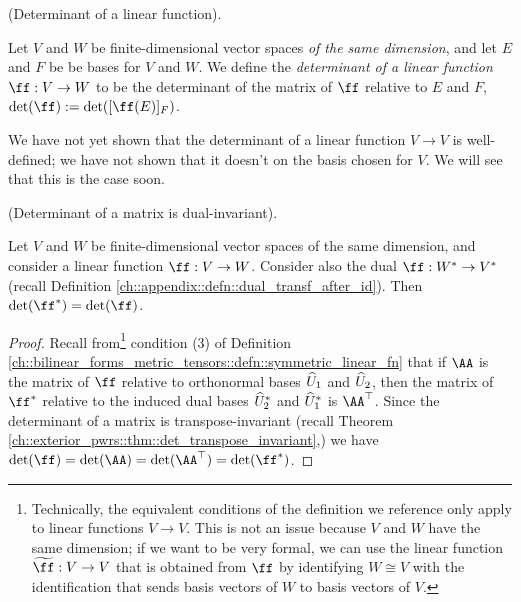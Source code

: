 

\begin{defn}
    (Determinant of a linear function).
    
    Let $V$ and $W$ be finite-dimensional vector spaces \textit{of the same dimension}, and let $E$ and $F$ be be bases for $V$ and $W$. We define the \textit{determinant of a linear function $\ff:V \rightarrow W$} to be the determinant of the matrix of $\ff$ relative to $E$ and $F$, $\det(\ff) := \det([\ff(E)]_F)$.
\end{defn}

\begin{remark}
    We have not yet shown that the determinant of a linear function $V \rightarrow V$ is well-defined; we have not shown that it doesn't on the basis chosen for $V$. We will see that this is the case soon.
\end{remark}

\begin{theorem}
\label{ch::exterior_pwrs::rmk::det_dual_invariant}
    (Determinant of a matrix is dual-invariant).
    
    Let $V$ and $W$ be finite-dimensional vector spaces of the same dimension, and consider a linear function $\ff:V \rightarrow W$. Consider also the dual $\ff:W^* \rightarrow V^*$ (recall Definition \ref{ch::appendix::defn::dual_transf_after_id}). Then $\det(\ff^*) = \det(\ff)$.
\end{theorem}

\begin{proof}
    Recall from\footnote{Technically, the equivalent conditions of the definition we reference only apply to linear functions $V \rightarrow V$. This is not an issue because $V$ and $W$ have the same dimension; if we want to be very formal, we can use the linear function $\widetilde{\ff}:V \rightarrow V$ that is obtained from $\ff$ by identifying $W \cong V$ with the identification that sends basis vectors of $W$ to basis vectors of $V$.} condition (3) of Definition \ref{ch::bilinear_forms_metric_tensors::defn::symmetric_linear_fn} that if $\AA$ is the matrix of $\ff$ relative to orthonormal bases $\widehat{U}_1$ and $\widehat{U}_2$, then the matrix of $\ff^*$ relative to the induced dual bases $\widehat{U}_2^*$ and $\widehat{U}_1^*$ is $\AA^\top$. Since the determinant of a matrix is transpose-invariant (recall Theorem \ref{ch::exterior_pwrs::thm::det_transpose_invariant},) we have $\det(\ff) = \det(\AA) = \det(\AA^\top) = \det(\ff^*)$.
\end{proof}

